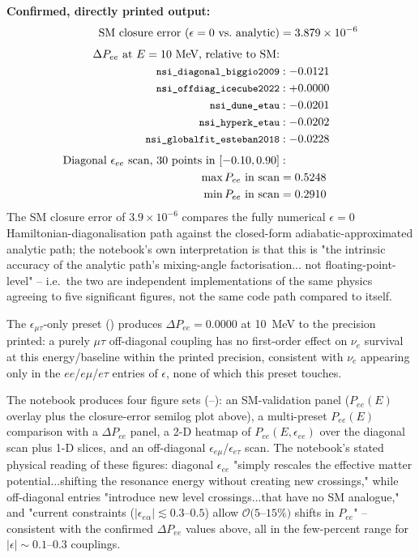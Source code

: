 \begin{resultbox}
\textbf{Confirmed, directly printed output:}
\begin{align*}
  \text{SM closure error }(\epsilon=0\text{ vs.\ analytic}) &= 3.879\times10^{-6} \\[4pt]
  \Delta P_{ee}\text{ at }E=10\text{ MeV, relative to SM:} \\
  \texttt{\small nsi\_diagonal\_biggio2009} &: -0.0121 \\
  \texttt{\small nsi\_offdiag\_icecube2022} &: +0.0000 \\
  \texttt{\small nsi\_dune\_etau} &: -0.0201 \\
  \texttt{\small nsi\_hyperk\_etau} &: -0.0202 \\
  \texttt{\small nsi\_globalfit\_esteban2018} &: -0.0228 \\[4pt]
  \text{Diagonal } \epsilon_{ee}\text{ scan, } 30\text{ points in }[-0.10,0.90]&: \\
  \max P_{ee} \text{ in scan} &= 0.5248 \\
  \min P_{ee} \text{ in scan} &= 0.2910
\end{align*}
The SM closure error of $3.9\times10^{-6}$ compares the fully numerical
$\epsilon=0$ Hamiltonian-diagonalisation path against the closed-form
adiabatic-approximated analytic path; the notebook's own interpretation is
that this is "the intrinsic accuracy of the analytic path's mixing-angle
factorisation... not floating-point-level" -- i.e.\ the two are independent
implementations of the same physics agreeing to five significant figures,
not the same code path compared to itself.
\end{resultbox}

\begin{notebox}
The $\epsilon_{\mu\tau}$-only preset ()
produces $\Delta P_{ee}=0.0000$ at 10~MeV to the precision printed: a purely
$\mu\tau$ off-diagonal coupling has no first-order effect on $\nu_e$
survival at this energy/baseline within the printed precision, consistent
with $\nu_e$ appearing only in the $ee$/$e\mu$/$e\tau$ entries of $\epsilon$,
none of which this preset touches.
\end{notebox}

The notebook produces four figure sets (--):
an SM-validation panel ($P_{ee}(E)$ overlay plus the closure-error semilog
plot above), a multi-preset $P_{ee}(E)$ comparison with a $\Delta P_{ee}$
panel, a 2-D heatmap of $P_{ee}(E,\epsilon_{ee})$ over the diagonal scan
plus 1-D slices, and an off-diagonal $\epsilon_{e\mu}$/$\epsilon_{e\tau}$
scan. The notebook's stated physical reading of these figures: diagonal
$\epsilon_{ee}$ "simply rescales the effective matter potential...shifting
the resonance energy without creating new crossings," while off-diagonal
entries "introduce new level crossings...that have no SM analogue," and
"current constraints ($|\epsilon_{e\alpha}|\lesssim0.3$--$0.5$) allow
$\mathcal{O}(5$--$15\%)$ shifts in $P_{ee}$" -- consistent with the
confirmed $\Delta P_{ee}$ values above, all in the few-percent range for
$|\epsilon|\sim0.1$--$0.3$ couplings.

